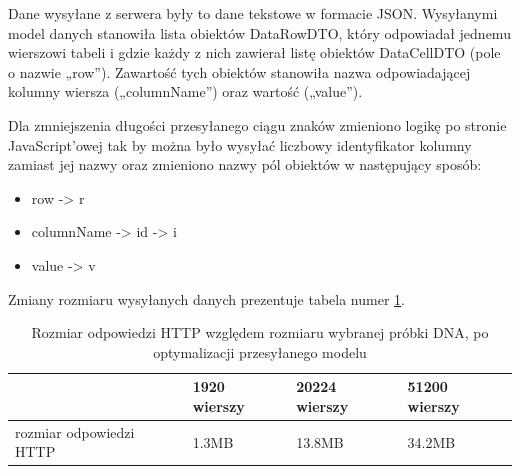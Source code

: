 \documentclass[a4paper,12pt,twoside]{article}
\begin{document}
Dane wysyłane z serwera były to dane tekstowe w formacie JSON.
Wysyłanymi model danych stanowiła lista obiektów DataRowDTO,
który odpowiadał jednemu wierszowi tabeli i gdzie każdy z nich zawierał listę obiektów DataCellDTO (pole o nazwie „row”). Zawartość tych obiektów stanowiła nazwa
odpowiadającej kolumny wiersza („columnName”) oraz wartość („value”).

Dla zmniejszenia długości przesyłanego ciągu znaków zmieniono logikę po stronie JavaScript'owej tak by
można było wysyłać liczbowy identyfikator kolumny zamiast jej nazwy
oraz zmieniono nazwy pól obiektów w następujący sposób:

\begin{itemize}
\item row -> r
\item columnName -> id -> i
\item value -> v
\end{itemize}
Zmiany rozmiaru wysyłanych danych prezentuje tabela numer \ref{table:requestSizeOpt}.
\begin{table} [H]
\begin{tabular}{| p{4cm} | p{2.7cm} | p{2.7cm} | p{2.7cm}|}
\hline
& 1920 wierszy & 20224 wierszy & 51200 wierszy\\
\hline
rozmiar odpowiedzi HTTP& 1.3MB&13.8MB& 34.2MB\\ \hline
\end{tabular}
\caption{Rozmiar odpowiedzi HTTP względem rozmiaru wybranej próbki DNA, po optymalizacji przesyłanego modelu}
\label{table:requestSizeOpt}
\end{table}

\newpage
\end{document}
